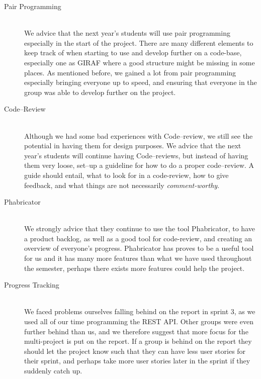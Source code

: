 \begin{description}
	\item[Pair Programming] \hfill \\
	We advice that the next year's students will use pair programming especially in the start of the project.
	There are many different elements to keep track of when starting to use and develop further on a code-base, especially one as GIRAF where a good structure might be missing in some places. 
	As mentioned before, we gained a lot from pair programming especially bringing everyone up to speed, and ensuring that everyone in the group was able to develop further on the project.

	\item[Code--Review] \hfill \\
	Although we had some bad experiences with Code--review, we still see the potential in having them for design purposes.
	We advice that the next year's students will continue having Code--reviews, but instead of having them very loose, set--up a guideline for how to do a proper code--review.
	A guide should entail, what to look for in a code-review, how to give feedback, and what things are not necessarily \textit{comment-worthy}.

	\item[Phabricator] \hfill \\
	We strongly advice that they continue to use the tool Phabricator, to have a product backlog, as well as a good tool for code-review, and creating an overview of everyone's progress.
	Phabricator has proves to be a useful tool for us and it has many more features than what we have used throughout the semester, perhaps there exists more features could help the project.


	\item[Progress Tracking] \hfill \\
	We faced problems ourselves falling behind on the report in sprint 3, as we used all of our time programming the REST API.
	Other groups were even further behind than us, and we therefore suggest that more focus for the multi-project is put on the report.
	If a group is behind on the report they should let the project know such that they can have less user stories for their sprint, and perhaps take more user stories later in the sprint if they suddenly catch up. 


\end{description}
